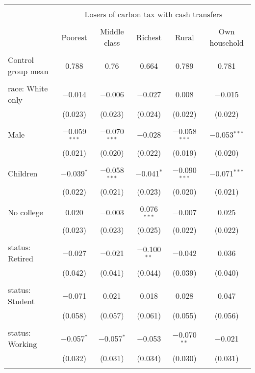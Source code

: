 
\begin{tabular}{@{\extracolsep{5pt}}lccccc} 
\\[-1.8ex]\hline 
\hline \\[-1.8ex] 
 & \multicolumn{5}{c}{Losers of carbon tax with cash transfers} \\ 
\cline{2-6} 
\\[-1.8ex] & Poorest & Middle class & Richest & Rural & Own household \\ 
\hline \\[-1.8ex] 
 Control group mean & 0.788 & 0.76 & 0.664 & 0.789 & 0.781  \\ \hline \\[-1.8ex] race: White only & $-$0.014 & $-$0.006 & $-$0.027 & 0.008 & $-$0.015 \\ 
  & (0.023) & (0.023) & (0.024) & (0.022) & (0.022) \\ 
  & & & & & \\ 
 Male & $-$0.059$^{***}$ & $-$0.070$^{***}$ & $-$0.028 & $-$0.058$^{***}$ & $-$0.053$^{***}$ \\ 
  & (0.021) & (0.020) & (0.022) & (0.019) & (0.020) \\ 
  & & & & & \\ 
 Children & $-$0.039$^{*}$ & $-$0.058$^{***}$ & $-$0.041$^{*}$ & $-$0.090$^{***}$ & $-$0.071$^{***}$ \\ 
  & (0.022) & (0.021) & (0.023) & (0.020) & (0.021) \\ 
  & & & & & \\ 
 No college & 0.020 & $-$0.003 & 0.076$^{***}$ & $-$0.007 & 0.025 \\ 
  & (0.023) & (0.023) & (0.025) & (0.022) & (0.022) \\ 
  & & & & & \\ 
 status: Retired & $-$0.027 & $-$0.021 & $-$0.100$^{**}$ & $-$0.042 & 0.036 \\ 
  & (0.042) & (0.041) & (0.044) & (0.039) & (0.040) \\ 
  & & & & & \\ 
 status: Student & $-$0.071 & 0.021 & 0.018 & 0.028 & 0.047 \\ 
  & (0.058) & (0.057) & (0.061) & (0.055) & (0.056) \\ 
  & & & & & \\ 
 status: Working & $-$0.057$^{*}$ & $-$0.057$^{*}$ & $-$0.053 & $-$0.070$^{**}$ & $-$0.021 \\ 
  & (0.032) & (0.031) & (0.034) & (0.030) & (0.031) \\ 
  & & & & & \\ 

\end{tabular}
